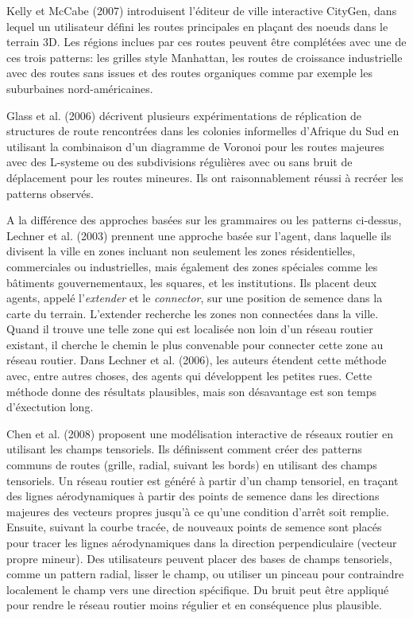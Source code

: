 \documentclass[11pt]{report}
\begin{document}
Kelly et McCabe (2007) introduisent l'éditeur de ville interactive CityGen, dans lequel un utilisateur défini les routes principales en plaçant des noeuds dans le terrain 3D. Les régions inclues par ces routes peuvent être complétées avec une de ces trois patterns: les grilles style Manhattan, les routes de croissance industrielle avec des routes sans issues et des routes organiques comme par exemple les suburbaines nord-américaines. \newline

Glass et al. (2006) décrivent plusieurs expérimentations de réplication de structures de route rencontrées dans les colonies informelles d'Afrique du Sud en utilisant la combinaison d'un diagramme de Voronoi pour les routes majeures avec des L-systeme ou des subdivisions régulières avec ou sans bruit de déplacement pour les routes mineures. Ils ont raisonnablement réussi à recréer les patterns observés. \newline

A la différence des approches basées sur les grammaires ou les patterns ci-dessus, Lechner et al. (2003) prennent une approche basée sur l'agent, dans laquelle ils divisent la ville en zones incluant non seulement les zones résidentielles, commerciales ou industrielles, mais également des zones spéciales comme les bâtiments gouvernementaux, les squares, et les institutions. Ils placent deux agents, appelé l'\textit{extender} et le \textit{connector}, sur une position de semence dans la carte du terrain. L'extender recherche les zones non connectées dans la ville. Quand il trouve une telle zone qui est localisée non loin d'un réseau routier existant, il cherche le chemin le plus convenable pour connecter cette zone au réseau routier. Dans Lechner et al. (2006), les auteurs étendent cette méthode avec, entre autres choses, des agents qui développent les petites rues. Cette méthode donne des résultats plausibles, mais son désavantage est son temps d'éxectution long. \newline

Chen et al. (2008) proposent une modélisation interactive de réseaux routier en utilisant les champs tensoriels. Ils définissent comment créer des patterns communs de routes (grille, radial, suivant les bords) en utilisant des champs tensoriels. Un réseau routier est généré à partir d'un champ tensoriel, en traçant des lignes aérodynamiques à partir des points de semence dans les directions majeures des vecteurs propres jusqu'à ce qu'une condition d'arrêt soit remplie. Ensuite, suivant la courbe tracée, de nouveaux points de semence sont placés pour tracer les lignes aérodynamiques dans la direction perpendiculaire (vecteur propre mineur). Des utilisateurs peuvent placer des bases de champs tensoriels, comme un pattern radial, lisser le champ, ou utiliser un pinceau pour contraindre localement le champ vers une direction spécifique. Du bruit peut être appliqué pour rendre le réseau routier moins régulier et en conséquence plus plausible. \newline
\end{document}
